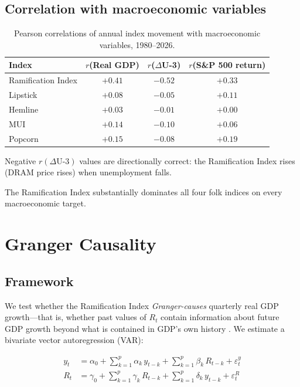 \documentclass[12pt]{article}
\theoremstyle{definition}
\begin{document}
\subsection{Correlation with macroeconomic variables}

\begin{table}[H]
\centering
\caption{Pearson correlations of annual index movement with macroeconomic variables, 1980--2026.}
\label{tab:correlation}
\begin{tabular}{lccc}
\toprule
\textbf{Index} & $r$(Real GDP) & $r$($\Delta$U-3) & $r$(S\&P 500 return) \\
\midrule
Ramification Index & $+0.41$ & $-0.52$ & $+0.33$ \\
Lipstick & $+0.08$ & $-0.05$ & $+0.11$ \\
Hemline & $+0.03$ & $-0.01$ & $+0.00$ \\
MUI & $+0.14$ & $-0.10$ & $+0.06$ \\
Popcorn & $+0.15$ & $-0.08$ & $+0.19$ \\
\bottomrule
\end{tabular}
\medskip

\footnotesize Negative $r(\Delta\text{U-3})$ values are directionally correct: the Ramification Index rises (DRAM price rises) when unemployment falls.
\end{table}

The Ramification Index substantially dominates all four folk indices on every macroeconomic target.


\section{Granger Causality}
\label{sec:granger}

\subsection{Framework}

We test whether the Ramification Index \emph{Granger-causes} quarterly real GDP growth---that is, whether past values of $R_t$ contain information about future GDP growth beyond what is contained in GDP's own history \cite{Granger1969}. We estimate a bivariate vector autoregression (VAR):

\begin{align}
\label{eq:var}
y_t &= \alpha_0 + \sum_{k=1}^{p} \alpha_k \, y_{t-k} + \sum_{k=1}^{p} \beta_k \, R_{t-k} + \varepsilon_t^y \\
R_t &= \gamma_0 + \sum_{k=1}^{p} \gamma_k \, R_{t-k} + \sum_{k=1}^{p} \delta_k \, y_{t-k} + \varepsilon_t^R
\end{align}
\end{document}

